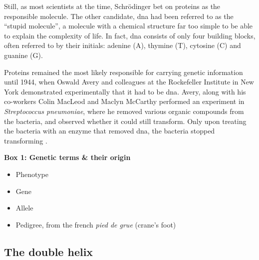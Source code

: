 Still, as most scientists at the time, Schrödinger bet on proteins as the responsible molecule. 
The other candidate, \gls{dna} had been referred to as the “stupid molecule”, a molecule with a chemical structure far too simple to be able to explain the complexity of life. 
In fact, \gls{dna} consists of only four building blocks, often referred to by their initials: adenine (A), thymine (T), cytosine (C) and guanine (G).

Proteins remained the most likely responsible for carrying genetic information until 1944, when Oswald Avery and colleagues at the Rockefeller Institute in New York demonstrated experimentally that it had to be \gls{dna}. 
Avery, along with his co-workers Colin MacLeod and Maclyn McCarthy performed an experiment in \textit{Streptococcus pneumoniae}, where he removed various organic compounds from the bacteria, and observed whether it could still transform. 
Only upon treating the bacteria with an enzyme that removed \gls{dna}, the bacteria stopped transforming \cite{avery1944studies}.\\


\begin{Comment}
\hspace{-2.5mm}\textbf{Box 1: Genetic terms \& their origin}\label{box1}
\begin{itemize}
    \item Phenotype
    \item Gene
    \item Allele
    \item Pedigree, from the french \textit{pied de grue} (crane's foot)

\end{itemize}


\end{Comment}

\subsection{The double helix} %

